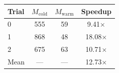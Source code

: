 \begin{tabular}{lccc}
\toprule
Trial & $M_{\mathrm{cold}}$ & $M_{\mathrm{warm}}$ & Speedup \\
\midrule
0 & 555 & 59 & 9.41$\times$ \\
1 & 868 & 48 & 18.08$\times$ \\
2 & 675 & 63 & 10.71$\times$ \\
\midrule
Mean & --- & --- & 12.73$\times$ \\
\bottomrule
\end{tabular}
